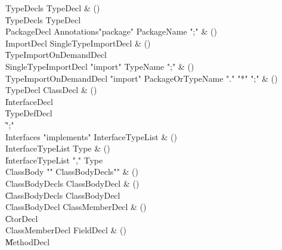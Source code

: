 \begin{bbgrammar}

 TypeDecls  \label{prod:TypeDecls}  \: TypeDecl & ()\\
    \| TypeDecls TypeDecl\\
 PackageDecl  \label{prod:PackageDecl}  \: Annotations\opt \xcd"package" PackageName \xcd";" & ()\\
 ImportDecl  \label{prod:ImportDecl}  \: SingleTypeImportDecl & ()\\
    \| TypeImportOnDemandDecl\\
 SingleTypeImportDecl  \label{prod:SingleTypeImportDecl}  \: \xcd"import" TypeName \xcd";" & ()\\
 TypeImportOnDemandDecl  \label{prod:TypeImportOnDemandDecl}  \: \xcd"import" PackageOrTypeName \xcd"." \xcd"*" \xcd";" & ()\\
 TypeDecl  \label{prod:TypeDecl}  \: ClassDecl & ()\\
    \| InterfaceDecl\\
    \| TypeDefDecl\\
    \| \xcd";"\\
 Interfaces  \label{prod:Interfaces}  \: \xcd"implements" InterfaceTypeList & ()\\
 InterfaceTypeList  \label{prod:InterfaceTypeList}  \: Type & ()\\
    \| InterfaceTypeList \xcd"," Type\\
 ClassBody  \label{prod:ClassBody}  \: \xcd"{" ClassBodyDecls\opt \xcd"}" & ()\\
 ClassBodyDecls  \label{prod:ClassBodyDecls}  \: ClassBodyDecl & ()\\
    \| ClassBodyDecls ClassBodyDecl\\
 ClassBodyDecl  \label{prod:ClassBodyDecl}  \: ClassMemberDecl & ()\\
    \| CtorDecl\\
 ClassMemberDecl  \label{prod:ClassMemberDecl}  \: FieldDecl & ()\\
    \| MethodDecl\\

\end{bbgrammar}
